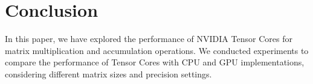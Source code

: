 \documentclass[conference]{IEEEtran}
\begin{document}
  \section{Conclusion}\label{sec:conclusion}
  
  In this paper, we have explored the performance of NVIDIA Tensor Cores for matrix multiplication and accumulation operations. 
  We conducted experiments to compare the performance of Tensor Cores with CPU and GPU implementations, 
  considering different matrix sizes and precision settings.
  



\end{document}
